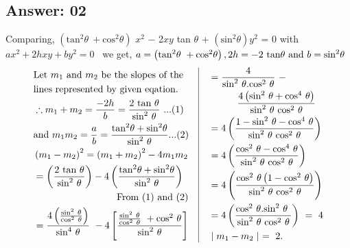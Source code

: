 \documentclass[17pt]{extarticle}
\begin{document}
\begin{fleqn}
\section{Answer: 02}
Comparing, $\left(\text{tan}^2\theta \ + \text{cos}^2\theta \right)$ $x^2$ $-$ 2$xy$ tan $\theta$ + $\left(\text{sin}^2\theta\right) y^2 $ = 0 with $ax^2 + 2hxy +  by^2 = 0 $  \ we get, $a = \left(\text{tan}^2\theta \ + \text{cos}^2\theta \right),\\ 2h = - 2\ \text {tan}\theta \  \text{and}\ b = \text{sin}^2\theta $
\vspace*{-3mm}
\begin{equation} \nonumber
\begin{alignedat}{4}
& \text {Let} \ m_1 \ \text{and}\ m_2\ \text {be the slopes of the}\\ 
& \text {lines represented by given eqation.}  \\
& \therefore m_1 + m_2 = \frac{-2h}{b} = \frac{2\ \text{tan}\ \theta}{\text {sin}^2\ \theta}\ ...(1)\\  
& \text {and} \ m_1 m_2 = \frac{a}{b} = \frac{\text{tan}^2 \theta + \text{sin}^2 \theta }{\text {sin}^2\ \theta} ...(2) \\ 
& \left(m_1 - m_2 \right)^2 = \left(m_1 + m_2 \right)^2 - 4m_1m_2 \\
& =\left( \frac{2\ \text{tan}\ \theta}{\text {sin}^2\ \theta}\right)-4\left( \frac{\text{tan}^2 \theta + \text{sin}^2 \theta }{\text {sin}^2\ \theta} \right) \\ 
& \ \ \ \ \ \ \ \ \ \ \ \ \ \ \ \ \ \ \ \ \ \ \ \ \ \  \text {From (1) and (2)}  \\
& = \frac{ 4\left( \frac{\text {sin}^2\ \theta}{\text {cos}^2\ \theta}\right) }{\text {sin}^4\ \theta}\ - 4\left[ \frac{ \frac{\text {sin}^2\ \theta}{\text {cos}^2\ \theta}\ + \text {cos}^2\ \theta}{\text {sin}^2\ \theta} \right]
\end{alignedat}
\quad
\vrule
\quad
\begin{alignedat}{4}
& = \frac{4}{\text {sin}^2\ \theta.\text {cos}^2\ \theta}\ - \\ 
& \ \ \ \  \ \ \ \ \ \frac{4 \left( \text {sin}^2\ \theta + \text {cos}^4\ \theta \right)}{\text {sin}^2\ \theta\ \text {cos}^2\ \theta} \\ 
& = 4\left( \frac{1 - \text {sin}^2\ \theta - \text {cos}^4\ \theta }{\text {sin}^2\ \theta\ \text {cos}^2\ \theta} \right) \\
& = 4\left( \frac{\text {cos}^2\ \theta - \text {cos}^4\ \theta }{\text {sin}^2\ \theta\ \text {cos}^2\ \theta} \right) \\
& = 4\left( \frac{\text {cos}^2\ \theta\left( 1- \text {cos}^2\ \theta \right) }{\text {sin}^2\ \theta\ \text {cos}^2\ \theta} \right) \\
& = 4\left( \frac{\text {cos}^2\ \theta.\text {sin}^2\ \theta\  }{\text {sin}^2\ \theta\ \text {cos}^2\ \theta} \right)\ = \ 4 \\
& \mid m_1-m_2 \mid \ = \ 2. 
\end{alignedat}
\end{equation}



\end{fleqn}
\end{document}
